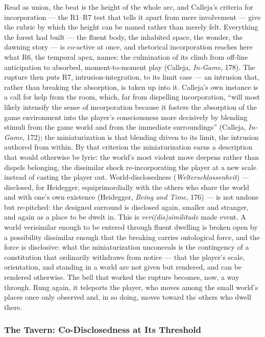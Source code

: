 \documentclass{article}
\begin{document}
Read as union, the beat is the height of the whole arc, and Calleja's criteria for incorporation — the R1--R7 test that tells it apart from mere involvement — give the rubric by which the height can be named rather than merely felt. Everything the forest had built — the fluent body, the inhabited space, the wonder, the dawning story — is co-active at once, and rhetorical incorporation reaches here what R6, the temporal apex, names: the culmination of its climb from off-line anticipation to absorbed, moment-to-moment play (Calleja, \textit{In-Game}, 178). The rupture then puts R7, intrusion-integration, to its limit case — an intrusion that, rather than breaking the absorption, is taken up into it. Calleja's own instance is a call for help from the room, which, far from dispelling incorporation, ``will most likely intensify the sense of incorporation because it fosters the absorption of the game environment into the player's consciousness more decisively by blending stimuli from the game world and from the immediate surroundings'' (Calleja, \textit{In-Game}, 172); the miniaturization is that blending driven to its limit, the intrusion authored from within. By that criterion the miniaturization earns a description that would otherwise be lyric: the world's most violent move deepens rather than dispels belonging, the dissimilar shock re-incorporating the player at a new scale instead of casting the player out. World-disclosedness (\textit{Welterschlossenheit}) — disclosed, for Heidegger, equiprimordially with the others who share the world and with one's own existence (Heidegger, \textit{Being and Time}, 176) — is not undone but re-pitched: the designed surround is disclosed again, smaller and stranger, and again as a place to be dwelt in. This is \textit{veri(dis)similitude} made event. A world verisimilar enough to be entered through fluent dwelling is broken open by a possibility dissimilar enough that the breaking carries ontological force, and the force is disclosive: what the miniaturization unconceals is the contingency of a constitution that ordinarily withdraws from notice — that the player's scale, orientation, and standing in a world are not given but rendered, and can be rendered otherwise. The bell that worked the rupture becomes, now, a way through. Rung again, it teleports the player, who moves among the small world's places once only observed and, in so doing, moves toward the others who dwell there.

\subsubsection*{The Tavern: Co-Disclosedness at Its Threshold}
\end{document}
